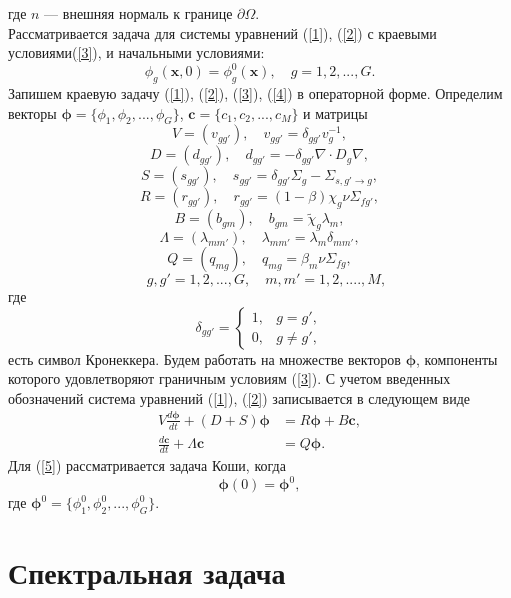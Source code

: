 где $n$ --- внешняя нормаль к границе $\partial \Omega$.
\\
Рассматривается задача для системы уравнений (\ref{1}), (\ref{2}) с краевыми условиями(\ref{3}), и начальными условиями:
\begin{equation}\label{4}
 \phi_g(\bm x,0) = \phi_g^0(\bm x), 
  \quad  g = 1,2, ..., G .
\end{equation} 
Запишем краевую задачу (\ref{1}), (\ref{2}), (\ref{3}), (\ref{4}) в операторной форме. 
Определим векторы $\bm \phi = \{\phi_1, \phi_2, ..., \phi_G\}$, $\bm c = \{c_1, c_2, ..., c_M\}$ и матрицы
\[
 V = (v_{g g'}),
 \quad v_{g g'} = \delta_{g g'} v_g^{-1},
\] 
\[
 D = (d_{g g'}),
 \quad d_{g g'} = - \delta_{g g'} \nabla \cdot D_g \nabla,
\] 
\[
 S = (s_{g g'}),
 \quad  s_{g g'} =  \delta_{g g'} \Sigma_g - \Sigma_{s,g'\rightarrow g} ,
\] 
\[
 R = (r_{g g'}),
 \quad  r_{g g'} = (1-\beta)\chi_g \nu \Sigma_{fg'} ,
\] 
\[
 B = (b_{g m}),
 \quad b_{g m} = \widetilde{\chi}_g \lambda_m,
\] 
\[
 \Lambda = (\lambda_{m m'}),
 \quad  \lambda_{m m'} = \lambda_m \delta_{m m'} ,
\] 
\[
 Q = (q_{mg}),
 \quad  q_{mg} = \beta_m \nu \Sigma_{fg},
\]
\[
 \quad g, g' = 1,2, ..., G,
 \quad m, m' = 1,2, ....,M,  
\]
где
\[
 \delta_{g g'} = \left \{ 
 \begin{matrix}
 1, & g = g', \\
 0, & g \neq  g',
 \end{matrix}
 \right . 
\] 
есть символ Кронеккера.
Будем работать на множестве векторов $\bm \phi$, компоненты которого удовлетворяют граничным условиям 
(\ref{3}). С учетом введенных обозначений система уравнений (\ref{1}), (\ref{2}) записывается в следующем виде
\begin{equation}\label{5}
\begin{split}
V \frac{d \bm \phi}{d t} + (D+S) \bm \phi &= R \bm \phi + B\bm c,
\\
\frac{d \bm c}{d t} + \Lambda \bm c &= Q \bm \phi. 
\end{split}
\end{equation}  
Для (\ref{5}) рассматривается задача Коши, когда
\begin{equation}\label{6}
 \bm \phi(0) = \bm \phi^0,
\end{equation} 
где $\bm \phi^0 = \{ \phi_1^0,  \phi_2^0, ...,  \phi_G^0 \}$.

\section{Спектральная задача} 

